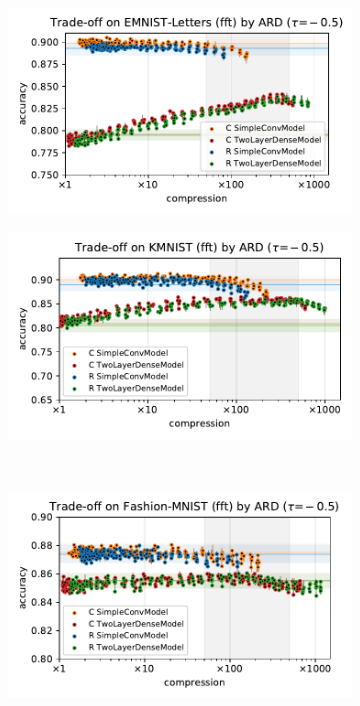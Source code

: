 \documentclass[a4paper,10pt,twocolumn]{article}
\begin{document}
\begin{figure}[b]
  \centering
  \begin{subfigure}[b]{0.5\columnwidth}
    \centering
    \includegraphics[width=\linewidth]{figure__mnist-like__trade-off/appendix__ARD__emnist_letters__fft__-0.5.pdf}
  \end{subfigure}%
  \begin{subfigure}[b]{0.5\columnwidth}
    \centering
    \includegraphics[width=\linewidth]{figure__mnist-like__trade-off/appendix__ARD__kmnist__fft__-0.5.pdf}
  \end{subfigure} \\ %
  \begin{subfigure}[b]{0.5\columnwidth}
    \centering
    \includegraphics[width=\linewidth]{figure__mnist-like__trade-off/appendix__ARD__fashionmnist__fft__-0.5.pdf}

\end{subfigure}
\end{figure}
\end{document}
